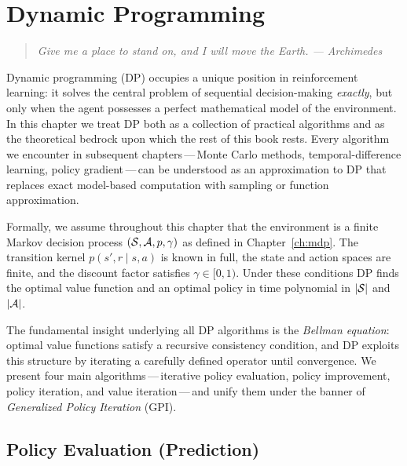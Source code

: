 \chapter{Dynamic Programming}
\label{ch:dp}

\begin{quote}
\itshape
Give me a place to stand on, and I will move the Earth.
\upshape --- Archimedes
\end{quote}

\bigskip

Dynamic programming (DP) occupies a unique position in reinforcement learning: it solves the central problem of sequential decision-making \emph{exactly}, but only when the agent possesses a perfect mathematical model of the environment.  In this chapter we treat DP both as a collection of practical algorithms and as the theoretical bedrock upon which the rest of this book rests.  Every algorithm we encounter in subsequent chapters\,---\,Monte Carlo methods, temporal-difference learning, policy gradient\,---\,can be understood as an approximation to DP that replaces exact model-based computation with sampling or function approximation.

Formally, we assume throughout this chapter that the environment is a finite Markov decision process $({\mathcal{S}}, {\mathcal{A}}, p, \gamma)$ as defined in Chapter~\ref{ch:mdp}.  The transition kernel $p(s', r \mid s, a)$ is known in full, the state and action spaces are finite, and the discount factor satisfies $\gamma \in [0,1)$.  Under these conditions DP finds the optimal value function and an optimal policy in time polynomial in $|\mathcal{S}|$ and $|\mathcal{A}|$.

The fundamental insight underlying all DP algorithms is the \emph{Bellman equation}: optimal value functions satisfy a recursive consistency condition, and DP exploits this structure by iterating a carefully defined operator until convergence.  We present four main algorithms\,---\,iterative policy evaluation, policy improvement, policy iteration, and value iteration\,---\,and unify them under the banner of \emph{Generalized Policy Iteration} (GPI).

\section{Policy Evaluation (Prediction)}
\label{sec:policy-evaluation}

